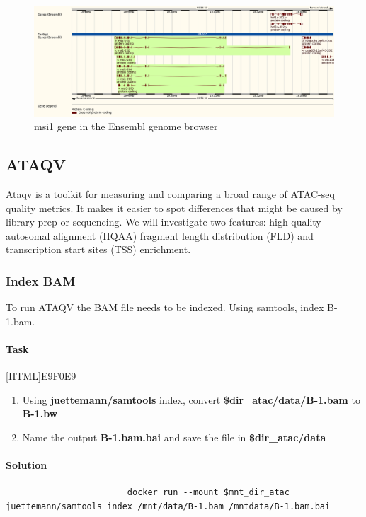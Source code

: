 \documentclass[12pt]{article}
\begin{document}
			\begin{figure}[H]
				\includegraphics[width=\textwidth]{Atlantic_salmon_msi1.png}
				\caption{msi1 gene in the Ensembl genome browser}
				\label{fig:msi1}
			\end{figure}
		
		\subsection{ATAQV}
			Ataqv is a toolkit for measuring and comparing a broad range of ATAC-seq quality metrics. 
			It makes it easier to spot differences that might be caused by library prep or sequencing. 
			We will investigate two features: high quality autosomal alignment (HQAA) fragment length distribution (FLD) and  transcription start sites (TSS) enrichment.
		
		\subsubsection{Index BAM}
			To run ATAQV the BAM file needs to be indexed. 
			Using samtools, index B-1.bam.
			
			\paragraph{Task}
			
				[HTML]{E9F0E9}{\parbox{\linewidth}{%
						\begin{enumerate}
							\item  Using \textbf{ juettemann/samtools} index, convert \textbf{\$dir\_atac/data/B-1.bam} to \textbf{B-1.bw}
							\item  Name the output \textbf{B-1.bam.bai} and save the file in \textbf{\$dir\_atac/data}
						\end{enumerate}
				}}
			
			\paragraph{Solution}
				\begin{minipage}{\linewidth}
					\begin{lstlisting}
						docker run --mount $mnt_dir_atac juettemann/samtools index /mnt/data/B-1.bam /mntdata/B-1.bam.bai
					\end{lstlisting}
				\end{minipage}
		
\end{document}
